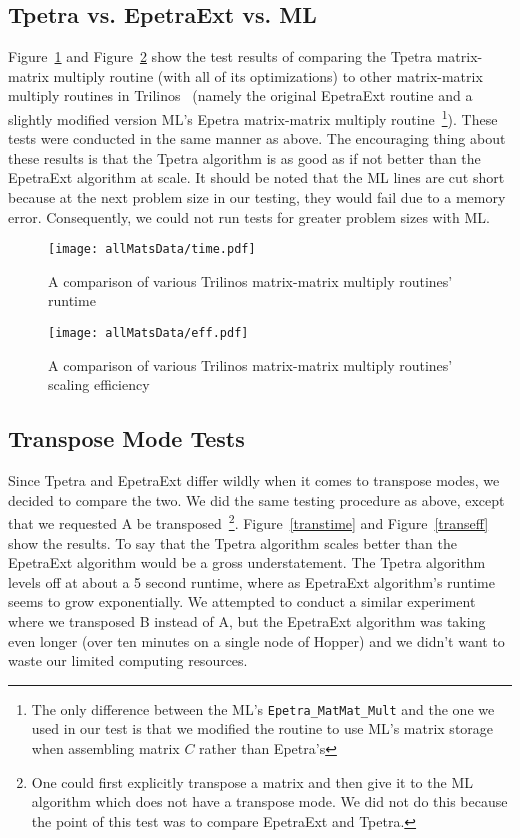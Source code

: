 \documentclass[pdf,12pt]{SANDreport}
\begin{document}
\subsection{Tpetra vs. EpetraExt vs. ML}
Figure~\ref{alltime} and Figure~\ref{alleff} show the test results of comparing the Tpetra matrix-matrix multiply routine 
(with all of its optimizations) to other matrix-matrix multiply routines in Trilinos~\cite{1089021} (namely the original 
EpetraExt routine and a slightly modified version ML's Epetra matrix-matrix multiply routine~\footnote{The only difference 
between the ML's \verb!Epetra_MatMat_Mult! and the one we used in our test is that we modified the routine to use ML's
matrix storage when assembling matrix $C$ rather than Epetra's}). 
These tests were conducted in the same manner as above. 
The encouraging thing about these results is that the Tpetra algorithm is as good as if not better than the EpetraExt 
algorithm at scale. It should be noted that the ML lines are cut short because at the next problem size in our testing, 
they would fail due to a memory error. Consequently, we could not run tests for greater problem sizes with ML. 

\begin{figure}
\centering
\texttt{[image: allMatsData/time.pdf]}
\caption[All Algorithms Time Comparison]{A comparison of various Trilinos matrix-matrix multiply routines' runtime}
\label{alltime}
\end{figure}

\begin{figure}
\centering
\texttt{[image: allMatsData/eff.pdf]}
\caption[All Algorithms Efficiency Comparison]{A comparison of various Trilinos matrix-matrix multiply routines' scaling efficiency}
\label{alleff}
\end{figure}

\subsection{Transpose Mode Tests}
Since Tpetra and EpetraExt differ wildly when it comes to transpose modes, we decided to compare the two. We did the same
testing procedure as above, except that we requested A be transposed~\footnote{One could first explicitly transpose a 
matrix and then give it to the ML algorithm which does not have a transpose mode. We did not do this because the point of 
this test was to compare EpetraExt and Tpetra.}. Figure~\ref{transtime}
and Figure~\ref{transeff} show the results. To say that the Tpetra algorithm scales better than the EpetraExt algorithm
would be a gross understatement. The Tpetra algorithm levels off at about a 5 second runtime, where as EpetraExt 
algorithm's runtime seems to grow exponentially. We attempted to conduct a similar experiment where we transposed B 
instead of A, 
but the EpetraExt algorithm was taking even longer (over ten minutes on a single node of Hopper) and we didn't want to 
waste our limited computing resources. 
\end{document}

